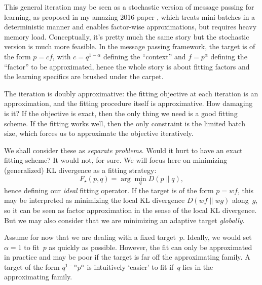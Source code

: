 \documentclass{article}
\begin{document}
This general iteration may be seen as a stochastic version of message passing for learning, as proposed in my amazing 2016 paper \cite{rr:16}, which treats mini-batches in a deterministic manner and enables factor-wise approximations, but requires heavy memory load. Conceptually, it's pretty much the same story but the stochastic version is much more feasible. In the message passing framework, the target is of the form $p=cf$, with $c=q^{1-\alpha}$ defining the ``context'' and $f=p^\alpha$ defining the ``factor'' to be approximated, hence the whole story is about fitting factors and the learning specifics are brushed under the carpet. 

The iteration is doubly approximative: the fitting objective at each iteration is an approximation, and the fitting procedure itself is approximative. How damaging is it? If the objective is exact, then the only thing we need is a good fitting scheme. If the fitting works well, then the only constraint is the limited batch size, which forces us to approximate the objective iteratively.

We shall consider these as {\em separate problems}. Would it hurt to have an exact fitting scheme? It would not, for sure. We will focus here on minimizing (generalized) KL divergence as a fitting strategy:
$$
F_\star(p, q) = \arg\min_q D(p\|q),
$$
hence defining our {\em ideal} fitting operator. If the target is of the form $p=wf$, this may be interpreted as minimizing the local KL divergence $D(wf\|wg)$ along~$g$, so it can be seen as factor approximation in the sense of the local KL divergence. But we may also consider that we are minimizing an adaptive target {\em globally}.

Assume for now that we are dealing with a fixed target~$p$. Ideally, we would set $\alpha=1$ to fit~$p$ as quickly as possible. However, the fit can only be approximated in practice and may be poor if the target is far off the approximating family. A target of the form $q^{1-\alpha}p^\alpha$ is intuitively `easier' to fit if~$q$ lies in the approximating family. 


\end{document}
